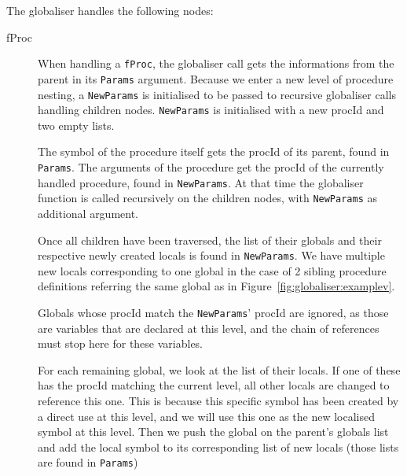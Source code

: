 \documentclass[a4paper]{memoir}
\begin{document}
The globaliser handles the following nodes:
\begin{description}
   \item[fProc] When handling a \lstinline!fProc!, the globaliser call gets the
     informations from the parent in its \lstinline!Params! argument. Because we
     enter a new level of procedure nesting, a \lstinline!NewParams! is
     initialised to be passed to recursive globaliser calls handling children
     nodes. \lstinline!NewParams! is initialised with a new procId and two empty lists. 

      The symbol of the procedure itself gets the procId of its parent, found in \lstinline!Params!. The arguments of the procedure get the procId of the currently handled procedure, found in \lstinline!NewParams!. At that time the globaliser function is called recursively on the children nodes, with \lstinline!NewParams! as additional argument.

      Once all children have been traversed, the list of their globals and their
      respective newly created locals is found in \lstinline!NewParams!.  We
      have multiple new locals corresponding to one global in the case of 2
      sibling procedure definitions referring the same global as in
      Figure~\ref{fig:globaliser:examplev}. 

      Globals whose procId match the \lstinline!NewParams!' procId are ignored, as those are variables that are declared at this level, and the chain of references must stop here for these variables.

      For each remaining global, we look at the list of their locals. 
      If one of these has the procId matching the current level, all other locals are changed to reference this one. This is because this specific symbol has been created by a direct use at this level, and we will use this one as the new localised symbol at this level. Then we push the global on the parent's globals list and add the local symbol to its corresponding list of new locals (those lists are found in \lstinline!Params!)


\end{description}
\end{document}
